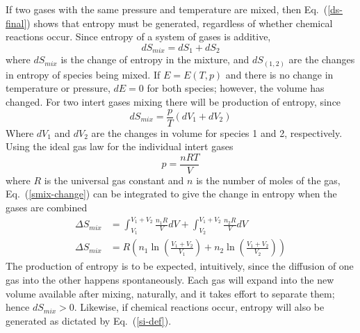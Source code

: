 \documentclass[a4paper]{article}
\newcommand{\eref}[1]{Eq.~(\ref{#1})}
\begin{document}
\begin{enumerate}
    If two gases with the same pressure and temperature are mixed, then
    \eref{ds-final} shows that entropy must be generated, regardless of whether
    chemical reactions occur.  Since entropy of a system of gases is additive,
    \begin{equation}
      dS_{mix} = dS_1 + dS_2
      \label{s-additive}
    \end{equation}
    where $dS_{mix}$ is the change of entropy in the mixture, and $dS_{(1,2)}$
    are the changes in entropy of species being mixed.  If $E = E(T,p)$ and
    there is no change in temperature or pressure, $dE = 0$ for both species;
    however, the volume has changed.  For two intert gases mixing there will be
    production of entropy, since
    \begin{equation}
      dS_{mix} = \frac{p}{T}\left( dV_1 + dV_2 \right)
      \label{smix-change}
    \end{equation}
    Where $dV_1$ and $dV_2$ are the changes in volume for species 1 and 2,
    respectively.  Using the ideal gas law for the individual intert gases
    \begin{equation}
      p = \frac{nRT}{V}
      \label{ideal-gas}
    \end{equation}
    where $R$ is the universal gas constant and $n$ is the number of moles of
    the gas, \eref{smix-change} can be integrated to give the change in entropy
    when the gases are combined
    \begin{equation}
      \boxed{\begin{aligned}
        \Delta S_{mix} &= \int_{V_1}^{V_1+V_2}\frac{n_1 R}{V}dV
        + \int_{V_2}^{V_1+V_2}\frac{n_2 R}{V}dV \\
        \Delta S_{mix} &= R\left( n_1 \ln\left( \frac{V_1 + V_2}{V_1} \right) + n_2
        \ln\left( \frac{V_1 + V_2}{V_2} \right) \right)
      \end{aligned}}
      \label{delta-change-smix}
    \end{equation}
    The production of entropy is to be expected, intuitively,
    since the diffusion of one gas into the other happens spontaneously.  Each
    gas will expand into the new volume available after mixing, naturally, and
    it takes effort to separate them; hence $dS_{mix} > 0$.  Likewise, if
    chemical reactions occur, entropy will also be generated as dictated by
    \eref{si-def}.


\end{enumerate}
\end{document}
